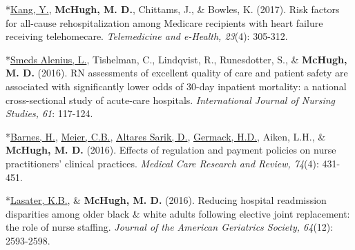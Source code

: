 \documentclass[10pt,]{article}
\begin{document}
{{{{{{{{{{{{{{{\begin{hangparas}{.25in}{1}
\end{hangparas}



\begin{hangparas}{.25in}{1}

*{\underline {Kang, Y.}}, {\textbf {McHugh, M. D.}}, Chittams, J., \& Bowles, K. (2017). Risk factors for all-cause rehospitalization among Medicare recipients with heart failure receiving telehomecare. {\textit {Telemedicine and e-Health, 23}}(4): 305-312.

\end{hangparas}



\begin{hangparas}{.25in}{1}

*{\underline {Smeds Alenius, L.}}, Tishelman, C., Lindqvist, R., Runesdotter, S., \& {\textbf {McHugh, M. D.}} (2016). RN assessments of excellent quality of care and patient safety are associated with significantly lower odds of 30-day inpatient mortality: a national cross-sectional study of acute-care hospitals. {\textit {International Journal of Nursing Studies, 61}}: 117-124.

\end{hangparas}



\begin{hangparas}{.25in}{1}

*{\underline {Barnes, H.}}, {\underline {Meier, C.B.}}, {\underline {Altares Sarik, D.}}, {\underline {Germack, H.D.}}, Aiken, L.H., \& {\textbf {McHugh, M. D.}} (2016). Effects of regulation and payment policies on nurse practitioners' clinical practices. {\textit {Medical Care Research and Review, 74}}(4): 431-451.

\end{hangparas}



\begin{hangparas}{.25in}{1}

*{\underline {Lasater, K.B.}}, \& {\textbf {McHugh, M. D.}} (2016). Reducing hospital readmission disparities among older black \& white adults following elective joint replacement: the role of nurse staffing. {\textit {Journal of the American Geriatrics Society, 64}}(12): 2593-2598.

\end{hangparas}



\begin{hangparas}{.25in}{1}


\end{hangparas}}}}}}}}}}}}}}}}
\end{document}
